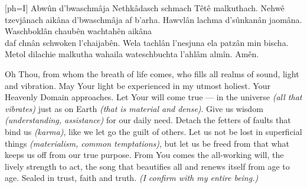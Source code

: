 
[ph={I}]
  \chordsoff %
  \beginverse\justifycenter
    \vspace{3em}
    Abwûn d'bwaschmâja
    \vspace{1em}
    Nethkâdasch schmach
    \vspace{1em}
    Têtê malkuthach.
    \vspace{1em}
    Nehwê tzevjânach aikâna d'bwaschmâja af b'arha.
    \vspace{1em}
    Hawvlân lachma d'sûnkanân jaomâna.
    \vspace{1em}
    Waschboklân chaubên wachtahên aikâna\\
    daf chnân schwoken l'chaijabên.
    \vspace{1em}
    Wela tachlân l'nesjuna
    \vspace{1em}
    ela patzân min bischa.
    \vspace{1em}
    Metol dilachie malkutha wahaila wateschbuchta l'ahlâm almîn.
    \vspace{1em}
    Amên.
    \vspace{5em}
  \endverse
  \brk %
  \begin{translation}\justifycenter
    \vspace{-2em} %
    Oh Thou, from whom the breath of life comes,
    who fills all realms of sound, light and vibration.
    \vspace{1em} %
    May Your light be experienced in my utmost holiest.
    \vspace{1.5em} %
    Your Heavenly Domain approaches.
    \vspace{0.5em} %
    Let Your will come true --- in the universe \emph{(all that vibrates)}
    just as on Earth \emph{(that is material and dense)}.
    \vspace{0.5em} %
    Give us wisdom \emph{(understanding, assistance)}
    for our daily need.
    \vspace{0.5em} %
    Detach the fetters of faults that bind us \emph{(karma)},
    like we let go the guilt of others.
    \vspace{1em} %
    Let us not be lost in superficial things
    \emph{(materialism, common temptations)},
    \vspace{0.5em} %
    but let us be freed from that what keeps us off from
    our true purpose.
    \vspace{0.5em} %
    From You comes the all-working will, the lively strength to act,
    the song that beautifies all and renews itself from age to age.
    \vspace{1em} %
    Sealed in trust, faith and truth.
    \emph{(I confirm with my entire being.)}
  \end{translation}
